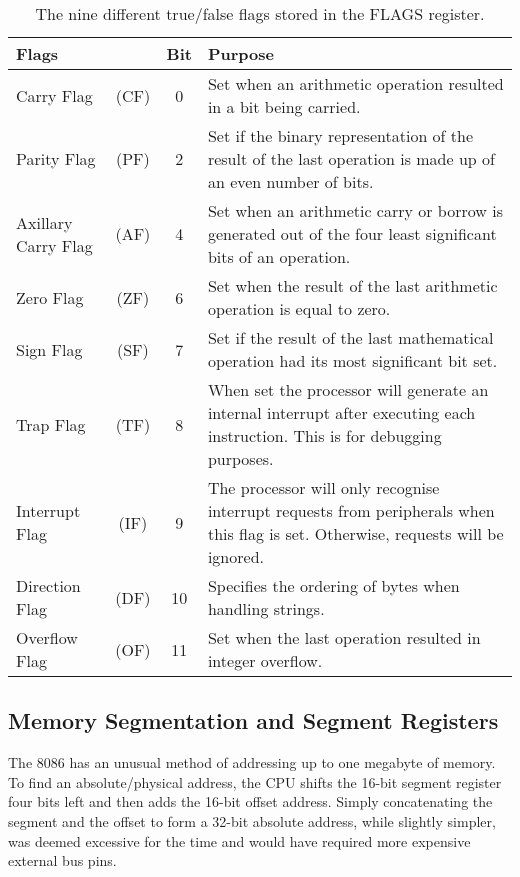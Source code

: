 	\begin{table}[h]
		\centering
		\begin{tabular} { | l c | c | m{} | }
			\hline
			Flags & & Bit & Purpose \\
			\hline
			Carry Flag 				& (CF) &  0 & Set when an arithmetic operation resulted in a bit being carried. \\
			Parity Flag 			& (PF) &  2 & Set if the binary representation of the result of the last operation is made up of an even number of bits. \\
			Axillary Carry Flag 	& (AF) &  4 & Set when an arithmetic carry or borrow is generated out of the four least significant bits of an operation. \\
			Zero Flag 				& (ZF) &  6 & Set when the result of the last arithmetic operation is equal to zero. \\
			Sign Flag 				& (SF) &  7 & Set if the result of the last mathematical operation had its most significant bit set. \\
			Trap Flag 				& (TF) &  8 & When set the processor will generate an internal interrupt after executing each instruction. This is for debugging purposes. \\
			Interrupt Flag 			& (IF) &  9 & The processor will only recognise interrupt requests from peripherals when this flag is set. Otherwise, requests will be ignored. \\
			Direction Flag 			& (DF) & 10 & Specifies the ordering of bytes when handling strings. \\
			Overflow Flag 			& (OF) & 11 & Set when the last operation resulted in integer overflow. \\
			\hline
		\end{tabular}
		\caption{The nine different true/false flags stored in the FLAGS register.}
		\label{table:flags}
	\end{table}

\subsection{Memory Segmentation and Segment Registers}
	The 8086 has an unusual method of addressing up to one megabyte of memory. To find an absolute/physical address, the CPU shifts the 16-bit segment register four bits left and then adds the 16-bit offset address. Simply concatenating the segment and the offset to form a 32-bit absolute address, while slightly simpler, was deemed excessive for the time and would have required more expensive external bus pins.

